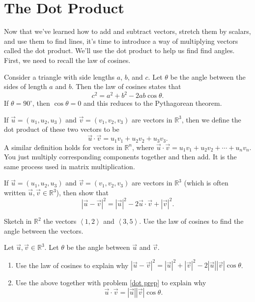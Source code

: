 \section{The Dot Product}
Now that we've learned how to add and subtract vectors, stretch them by scalars, and use them to find lines, it's time to introduce a way of multiplying vectors called the dot product.  We'll use the dot product to help us find find angles. First, we need to recall the law of cosines.
\begin{theorem*}
Consider a triangle with side lengths $a$, $b$, and $c$. Let $\theta$ be the angle between the sides of length $a$ and $b$. Then the law of cosines states that 
$$c^2=a^2+b^2-2ab\cos\theta.$$
If $\theta=90^\circ$, then $\cos\theta=0$ and this reduces to the Pythagorean theorem.
\end{theorem*}

\begin{definition}
If $\vec u = (u_1,u_2,u_3)$ and $\vec v= (v_1,v_2,v_3)$ are vectors in $\mathbb{R}^3$, then we define the dot product of these two vectors to be 
$$\vec u\cdot \vec v = u_1 v_1+ u_2 v_2+ u_3 v_3.$$
A similar definition holds for vectors in $\mathbb{R}^n$, where
$\vec u\cdot \vec v = u_1 v_1+ u_2 v_2+\cdots+ u_n v_n.$
You just multiply corresponding components together and then add. It is the same process used in matrix multiplication.
\end{definition}

\begin{problem}\label{dot prep} 
If $\vec u = (u_1,u_2,u_3)$ and $\vec v= (v_1,v_2,v_3)$ are vectors in $\mathbb{R}^3$ (which is often written $\vec u,\vec v\in\mathbb{R}^3$), then show that 
$$|\vec u-\vec v|^2 = |\vec u|^2-2\vec u\cdot \vec v +|\vec v|^2.$$
\end{problem}

\begin{problem} 
Sketch in $\mathbb{R}^2$ the vectors $\left<1,2\right>$ and $\left<3,5\right>$.  Use the law of cosines to find the angle between the vectors.
\end{problem}


\begin{problem}\label{dot angle formula}  
Let $\vec u,\vec v\in\mathbb{R}^3$. Let $\theta$ be the angle between $\vec u$ and $\vec v$. 
\begin{enumerate}
\item Use the law of cosines to explain why $|\vec u-\vec v|^2=|\vec u|^2+|\vec v|^2-2|\vec u||\vec v|\cos\theta$.
\item Use the above together with problem \ref{dot prep} to explain why $$\vec u\cdot \vec v=|\vec u||\vec v|\cos\theta.$$
\end{enumerate}
\end{problem}

